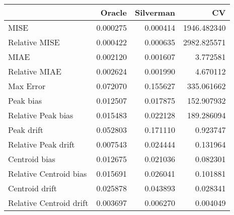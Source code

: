\begin{tabular}{lrrr}
  \hline
 & Oracle & Silverman & CV \\ 
  \hline
MISE & 0.000275 & 0.000414 & 1946.482340 \\ 
  Relative MISE & 0.000422 & 0.000635 & 2982.825571 \\ 
  MIAE & 0.002120 & 0.001607 & 3.772581 \\ 
  Relative MIAE & 0.002624 & 0.001990 & 4.670112 \\ 
  Max Error & 0.072070 & 0.155627 & 335.061662 \\ 
  Peak bias & 0.012507 & 0.017875 & 152.907932 \\ 
  Relative Peak bias & 0.015483 & 0.022128 & 189.286094 \\ 
  Peak drift & 0.052803 & 0.171110 & 0.923747 \\ 
  Relative Peak drift & 0.007543 & 0.024444 & 0.131964 \\ 
  Centroid bias & 0.012675 & 0.021036 & 0.082301 \\ 
  Relative Centroid bias & 0.015691 & 0.026041 & 0.101881 \\ 
  Centroid drift & 0.025878 & 0.043893 & 0.028341 \\ 
  Relative Centroid drift & 0.003697 & 0.006270 & 0.004049 \\ 
   \hline
\end{tabular}
